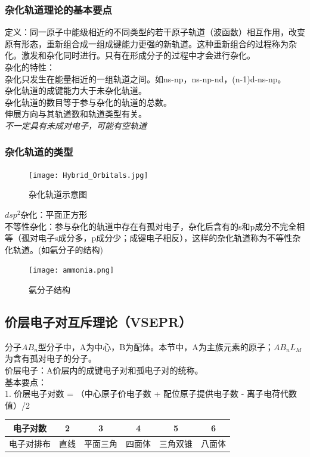 \documentclass[utf8,a4paper,12pt]{ctexart}
\begin{document}
\subsubsection{杂化轨道理论的基本要点}
定义：同一原子中能级相近的不同类型的若干原子轨道（波函数）相互作用，改变原有形态，重新组合成一组成键能力更强的新轨道。这种重新组合的过程称为杂化。激发和杂化同时进行。只有在形成分子的过程中才会进行杂化。\\
杂化的特性：\\
杂化只发生在能量相近的一组轨道之间。如ns-np，ns-np-nd，(n-1)d-ns-np。\\
杂化轨道的成键能力大于未杂化轨道。\\
杂化轨道的数目等于参与杂化的轨道的总数。\\
伸展方向与其轨道数和轨道类型有关。\\
\emph{不一定具有未成对电子，可能有空轨道}
\subsubsection{杂化轨道的类型}
\begin{figure}[H]
\centering
\texttt{[image: Hybrid\_Orbitals.jpg]}
\caption{杂化轨道示意图}
\end{figure}
$dsp^2$杂化：平面正方形\\
不等性杂化：参与杂化的轨道中存在有孤对电子，杂化后含有的s和p成分不完全相等（孤对电子s成分多，p成分少；成键电子相反），这样的杂化轨道称为不等性杂化轨道。(如氨分子的结构)\\
\begin{figure}[H]
\centering
\texttt{[image: ammonia.png]}
\caption{氨分子结构}
\end{figure}
\subsection{价层电子对互斥理论（VSEPR）}
分子$AB_n$型分子中，A为中心，B为配体。本节中，A为主族元素的原子；$AB_nL_M$为含有孤对电子的分子。\\
价层电子：A价层内的成键电子对和孤电子对的统称。\\
基本要点：\\
1. 价层电子对数 = （中心原子价电子数 + 配位原子提供电子数 - 离子电荷代数值）/2\\
\begin{table}[H]
\centering
\begin{tabular}{c|ccccc}
\toprule
电子对数&2&3&4&5&6\\
\hline
电子对排布&直线&平面三角&四面体&三角双锥&八面体\\
\bottomrule
\end{tabular}
\end{table}
\end{document}
